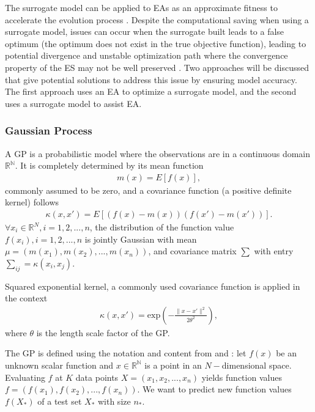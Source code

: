 The surrogate model can be applied to EAs as an approximate fitness to accelerate the evolution process \cite{Ratle:1998:ACE:645824.668750}. Despite the computational saving when using a surrogate model, issues can occur when the surrogate built leads to a false optimum (the optimum does not exist in the true objective function), leading to potential divergence and unstable optimization path where the convergence property of the ES may not be well preserved \cite{JIN201161}. Two approaches will be discussed that give potential solutions to address this issue by ensuring model accuracy. The first approach uses an EA to optimize a surrogate model, and the second uses a surrogate model to assist EA. 


\subsubsection{Gaussian Process}\label{sssec:GP}\hfill

A GP is a probabilistic model where the observations are in a continuous domain $\mathbb{R^N}$. It is completely determined by its mean function 
\begin{align}
m(x) = E [ f(x)],
\end{align}
commonly assumed to be zero, and a covariance function (a positive definite kernel) follows
\begin{align}
\kappa(x, x \prime) = E[(f(x)-m(x))(f(x \prime)-m(x \prime))].		
\end{align} 
$\forall x_i \in \mathbb{R}^N, i=1,2,...,n$, the distribution of the function value $f(x_i),i=1,2,...,n$ is jointly Gaussian with mean $\mu = (m(x_1),m(x_2),...,m(x_n))$, and covariance matrix $\sum$ with entry $\sum_{ij} = \kappa (x_i,x_j)$. 

Squared exponential kernel, a commonly used covariance function is applied in the context 
\begin{align}
\kappa(x, x \prime) = \text{exp} \left( - \frac{\|x - x \prime \|^2}{2 \theta^2} \right),
\end{align}
where $\theta$ is the length scale factor of the GP.

The GP is defined using the notation and content from \cite{rasmussen2004gaussian} and \cite{Murphy:2012:MLP:2380985}: let $f(x)$ be an unknown scalar function and $x \in \mathbb{R^N}$ is a point in an $N-$dimensional space. Evaluating $f$ at $K$ data points $X=(x_1,x_2,...,x_n)$ yields function values $f = (f(x_1),f(x_2),...,f(x_n))$. We want to predict new function values $f(X_*)$ of a test set $X_*$ with size $n_*$.

